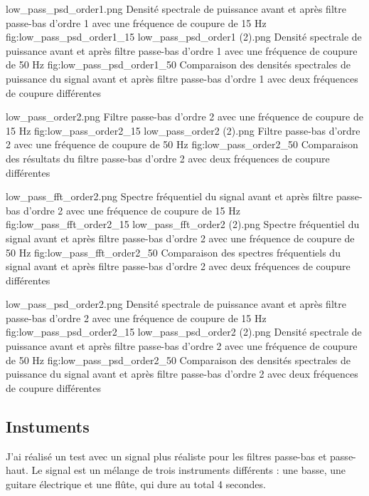 \documentclass{article}
\begin{document}
\DoubleFigure
    {low_pass_psd_order1.png}
    {Densité spectrale de puissance avant et après filtre passe-bas d'ordre 1 avec une fréquence de coupure de 15 Hz}
    {fig:low_pass_psd_order1_15}
    {low_pass_psd_order1 (2).png}
    {Densité spectrale de puissance avant et après filtre passe-bas d'ordre 1 avec une fréquence de coupure de 50 Hz}
    {fig:low_pass_psd_order1_50}
    {Comparaison des densités spectrales de puissance du signal avant et après filtre passe-bas d'ordre 1 avec deux fréquences de coupure différentes}

\DoubleFigure
    {low_pass_order2.png}
    {Filtre passe-bas d'ordre 2 avec une fréquence de coupure de 15 Hz}
    {fig:low_pass_order2_15}
    {low_pass_order2 (2).png}
    {Filtre passe-bas d'ordre 2 avec une fréquence de coupure de 50 Hz}
    {fig:low_pass_order2_50}
    {Comparaison des résultats du filtre passe-bas d'ordre 2 avec deux fréquences de coupure différentes}

\DoubleFigure
    {low_pass_fft_order2.png}
    {Spectre fréquentiel du signal avant et après filtre passe-bas d'ordre 2 avec une fréquence de coupure de 15 Hz}
    {fig:low_pass_fft_order2_15}
    {low_pass_fft_order2 (2).png}
    {Spectre fréquentiel du signal avant et après filtre passe-bas d'ordre 2 avec une fréquence de coupure de 50 Hz}
    {fig:low_pass_fft_order2_50}
    {Comparaison des spectres fréquentiels du signal avant et après filtre passe-bas d'ordre 2 avec deux fréquences de coupure différentes}

\DoubleFigure
    {low_pass_psd_order2.png}
    {Densité spectrale de puissance avant et après filtre passe-bas d'ordre 2 avec une fréquence de coupure de 15 Hz}
    {fig:low_pass_psd_order2_15}
    {low_pass_psd_order2 (2).png}
    {Densité spectrale de puissance avant et après filtre passe-bas d'ordre 2 avec une fréquence de coupure de 50 Hz}
    {fig:low_pass_psd_order2_50}
    {Comparaison des densités spectrales de puissance du signal avant et après filtre passe-bas d'ordre 2 avec deux fréquences de coupure différentes}

\FloatBarrier

\newpage

\subsection{Instuments}

J'ai réalisé un test avec un signal plus réaliste pour les filtres passe-bas et passe-haut. Le signal est un mélange de trois instruments différents : 
une basse, une guitare électrique et une flûte, qui dure au total 4 secondes. 
\end{document}

